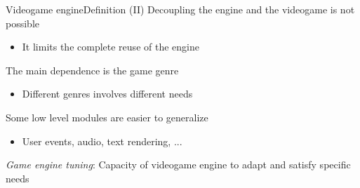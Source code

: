 \documentclass[10pt,compress]{beamer} %
\begin{document}
\begin{frame}{Videogame engine}{Definition (II)}
	Decoupling the engine and the videogame is not possible
	\begin{itemize}
		\item It limits the complete reuse of the engine
	\end{itemize}
	The main dependence is the game genre
	\begin{itemize}
		\item Different genres involves different needs
	\end{itemize}
	Some low level modules are easier to generalize
	\begin{itemize}
		\item User events, audio, text rendering, ...
	\end{itemize}
	\textit{Game engine tuning}: Capacity of videogame engine to adapt and satisfy specific needs
\end{frame}
\end{document}
